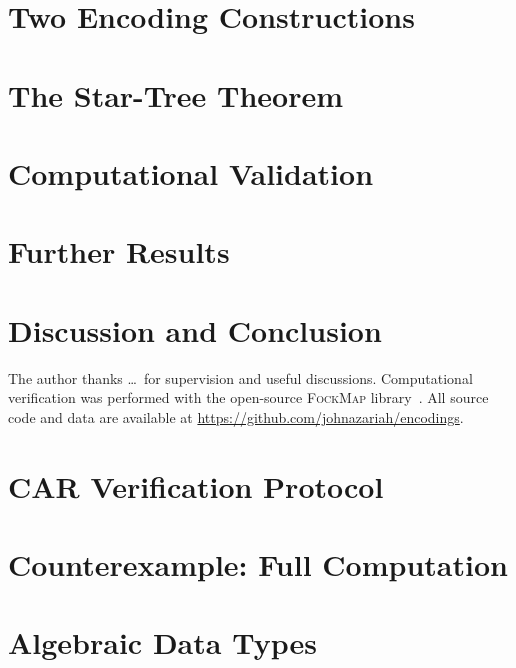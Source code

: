 \documentclass[aps,pra,preprint,superscriptaddress,showpacs]{revtex4-2}
\theoremstyle{definition}
\theoremstyle{remark}
\begin{document}
\section{Two Encoding Constructions}
\label{sec:constructions}


\section{The Star-Tree Theorem}
\label{sec:star-tree}


\section{Computational Validation}
\label{sec:validation}


\section{Further Results}
\label{sec:further}


\section{Discussion and Conclusion}
\label{sec:discussion}


\begin{acknowledgments}
The author thanks \ldots\ for supervision and useful discussions.
Computational verification was performed with the open-source
\textsc{FockMap} library~\cite{fockmap2026}.
All source code and data are available at
\url{https://github.com/johnazariah/encodings}.
\end{acknowledgments}



\appendix

\section{CAR Verification Protocol}
\label{app:car-verification}


\section{Counterexample: Full Computation}
\label{app:counterexample}


\section{Algebraic Data Types}
\label{app:datatypes}

\end{document}

